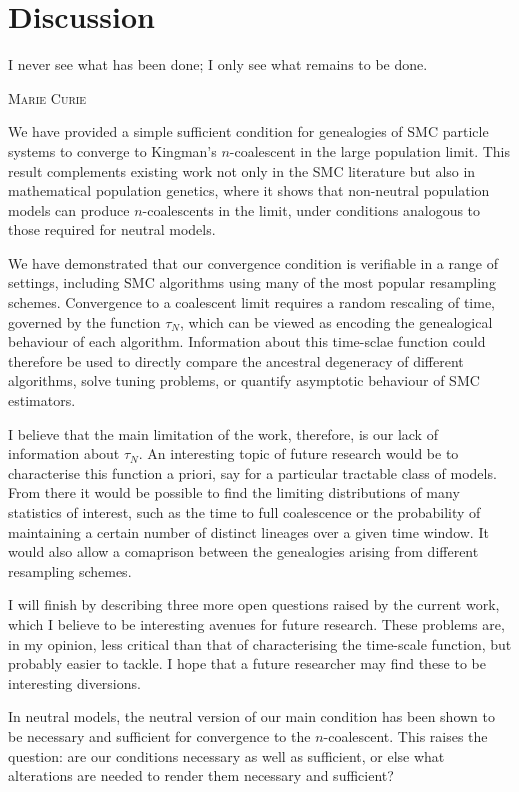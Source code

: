 \chapter{Discussion}

\epigraph{
I never see what has been done; I only see what remains to be done.
}
{\textsc{Marie Curie}}

We have provided a simple sufficient condition for genealogies of SMC particle systems to converge to Kingman's $n$-coalescent in the large population limit. 
This result complements existing work not only in the SMC literature but also in mathematical population genetics, where it shows that non-neutral population models can produce $n$-coalescents in the limit, under conditions analogous to those required for neutral models.

We have demonstrated that our convergence condition is verifiable in a range of settings, including SMC algorithms using many of the most popular resampling schemes. 
Convergence to a coalescent limit requires a random rescaling of time, governed by the function $\tau_N$, which can be viewed as encoding the genealogical behaviour of each algorithm.
Information about this time-sclae function could therefore be used to directly compare the ancestral degeneracy of different algorithms, solve tuning problems, or quantify asymptotic behaviour of SMC estimators.

I believe that the main limitation of the work, therefore, is our lack of information about $\tau_N$. An interesting topic of future research would be to characterise this function a priori, say for a particular tractable class of models.
From there it would be possible to find the limiting distributions of many statistics of interest, such as the time to full coalescence or the probability of maintaining a certain number of distinct lineages over a given time window. It would also allow a comaprison between the genealogies arising from different resampling schemes.

I will finish by describing three more open questions raised by the current work, which I believe to be interesting avenues for future research. These problems are, in my opinion, less critical than that of characterising the time-scale function, but probably easier to tackle. 
I hope that a future researcher may find these to be interesting diversions.

In neutral models, the neutral version of our main condition has been shown to be necessary and sufficient for convergence to the $n$-coalescent. This raises the question: are our conditions necessary as well as sufficient, or else what alterations are needed to render them necessary and sufficient?

